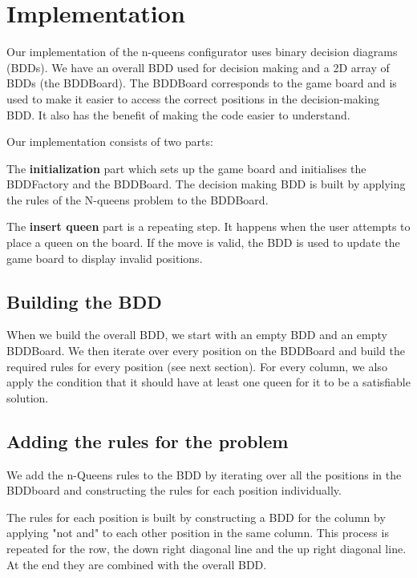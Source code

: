 \section{Implementation}
\label{Implementation}
Our implementation of the n-queens configurator uses binary decision diagrams (BDDs). We have an overall BDD used for decision making and a 2D array of BDDs (the BDDBoard). The BDDBoard corresponds to the game board and is used to make it easier to access the correct positions in the decision-making BDD. It also has the benefit of making the code easier to understand.

Our implementation consists of two parts:
\begin{my_enumerate}

	\item The \textbf{initialization} part which sets up the game board and initialises the BDDFactory and the BDDBoard. The decision making BDD is built by applying the rules of the N-queens problem to the BDDBoard.

	\item The \textbf{insert queen} part is a repeating step. It happens when the user attempts to place a queen on the board. If the move is valid, the BDD is used to update the game board to display invalid positions.

\end{my_enumerate}

\subsection{Building the BDD}

When we build the overall BDD, we start with an empty BDD and an empty BDDBoard. We then iterate over every position on the BDDBoard and build the required rules for every position (see next section). For every column, we also apply the condition that it should have at least one queen for it to be a satisfiable solution.

\subsection{Adding the rules for the problem}
We add the n-Queens rules to the BDD by iterating over all the positions in the BDDboard and constructing the rules for each position individually.

The rules for each position is built by constructing a BDD for the column by applying "not and" to each other position in the same column. This process is repeated for the row, the down right diagonal line and the up right diagonal line. At the end they are combined with the overall BDD.

